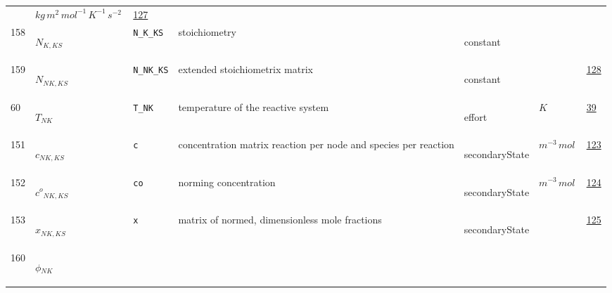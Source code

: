 \begin{longtable}{|p{1cm}|p{2.5cm}|p{4.5cm}|p{8cm}|p{3.0cm}|p{3cm}|p{1cm}|}
             & $ kg \,m^{2} \,mol^{-1} \,K^{-1} \,s^{-2} \, $
             & \hyperlink{"e:127"}{ 127 }
                 \\
    158
             & \hypertarget{"v:158"}{ $ {N}{_{K, {K S}}} $}
             & \verb|N_K_KS|
             & stoichiometry
             & \begin{lay}constant \end{lay}
             & $  $
             & \\
    159
             & \hypertarget{"v:159"}{ $ {N}{_{{N K}, {K S}}} $}
             & \verb|N_NK_KS|
             & extended stoichiometrix matrix
             & \begin{lay}constant \end{lay}
             & $  $
             & \hyperlink{"e:128"}{ 128 }
                 \\
    60
             & \hypertarget{"v:60"}{ $ {T}{_{{N K}}} $}
             & \verb|T_NK|
             & temperature of the reactive system
             & \begin{lay}effort \end{lay}
             & $ K \, $
             & \hyperlink{"e:39"}{ 39 }
                 \\
    151
             & \hypertarget{"v:151"}{ $ {c}{_{{N K}, {K S}}} $}
             & \verb|c|
             & concentration matrix reaction per node and species per reaction
             & \begin{lay}secondaryState \end{lay}
             & $ m^{-3} \,mol \, $
             & \hyperlink{"e:123"}{ 123 }
                 \\
    152
             & \hypertarget{"v:152"}{ $ {{c^o}}{_{{N K}, {K S}}} $}
             & \verb|co|
             & norming concentration
             & \begin{lay}secondaryState \end{lay}
             & $ m^{-3} \,mol \, $
             & \hyperlink{"e:124"}{ 124 }
                 \\
    153
             & \hypertarget{"v:153"}{ $ {x}{_{{N K}, {K S}}} $}
             & \verb|x|
             & matrix of normed, dimensionless mole fractions 
             & \begin{lay}secondaryState \end{lay}
             & $  $
             & \hyperlink{"e:125"}{ 125 }
                 \\
    160
             & \hypertarget{"v:160"}{ $ {\phi}{_{{N K}}} $}

\end{longtable}
